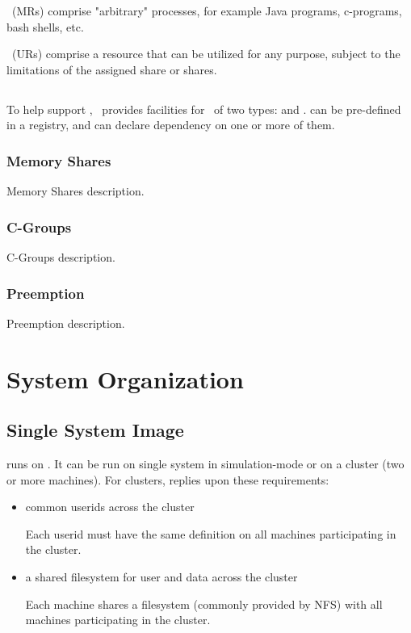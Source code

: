    \varManagedReservations~(MRs) comprise "arbitrary" processes, for example Java
    programs, c-programs, bash shells, etc.
    
    \varUnmanagedReservations~(URs) comprise a resource that can be utilized for any 
    purpose, subject to the limitations of the assigned share or shares.
            
    \section{\varServices}
       
    To help support \varJobs, \varDUCC~provides facilities for \varServices~of two types: 
    \varUIMA and \varPingOnly. \varServices can be pre-defined in a registry, and \varJobs
    can declare dependency on one or more of them.
    
    \subsection{Memory Shares} 
    
    Memory Shares description.
    
    \subsection{C-Groups} 
    
    C-Groups description.
    
    \subsection{Preemption} 
        
    Preemption description.
    
\chapter{System Organization}

    \section{Single System Image}
    
    \varDUCC runs on \varLinux. It can be run on single system in simulation-mode
    or on a cluster (two or more machines). For clusters, \varDUCC replies upon 
    these requirements:
    
    \begin{itemize}
      \item common userids across the cluster
      
      Each userid must have the same definition on all machines participating
      in the \varDUCC cluster.
      
      \item a shared filesystem for user and \varDUCC data across the cluster
      
      Each machine shares a filesystem (commonly provided by NFS) with all 
      machines participating in the \varDUCC cluster.
      
    \end{itemize} 
    
